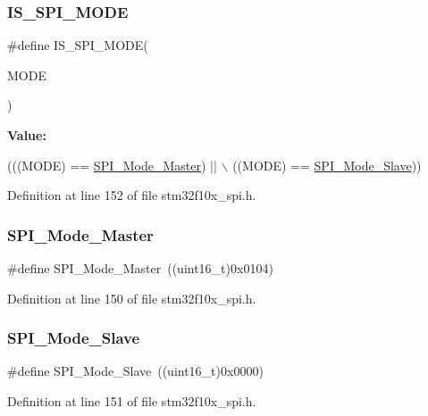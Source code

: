 \subsubsection{\texorpdfstring{I\+S\+\_\+\+S\+P\+I\+\_\+\+M\+O\+DE}{IS\_SPI\_MODE}}
{\footnotesize\ttfamily \#define I\+S\+\_\+\+S\+P\+I\+\_\+\+M\+O\+DE(\begin{DoxyParamCaption}\item[{}]{M\+O\+DE }\end{DoxyParamCaption})}

{\bfseries Value\+:}
\begin{DoxyCode}
(((MODE) == \hyperlink{group___s_p_i__mode_gaa9e47fb7c1d6c4655b72a00ed1f3b651}{SPI\_Mode\_Master}) || \(\backslash\)
                           ((MODE) == \hyperlink{group___s_p_i__mode_ga84621141413ee07cb2d2dc82da2baa42}{SPI\_Mode\_Slave}))
\end{DoxyCode}


Definition at line 152 of file stm32f10x\+\_\+spi.\+h.

\mbox{\label{group___s_p_i__mode_gaa9e47fb7c1d6c4655b72a00ed1f3b651}} 
\subsubsection{\texorpdfstring{S\+P\+I\+\_\+\+Mode\+\_\+\+Master}{SPI\_Mode\_Master}}
{\footnotesize\ttfamily \#define S\+P\+I\+\_\+\+Mode\+\_\+\+Master~((uint16\+\_\+t)0x0104)}



Definition at line 150 of file stm32f10x\+\_\+spi.\+h.

\mbox{\label{group___s_p_i__mode_ga84621141413ee07cb2d2dc82da2baa42}} 
\subsubsection{\texorpdfstring{S\+P\+I\+\_\+\+Mode\+\_\+\+Slave}{SPI\_Mode\_Slave}}
{\footnotesize\ttfamily \#define S\+P\+I\+\_\+\+Mode\+\_\+\+Slave~((uint16\+\_\+t)0x0000)}



Definition at line 151 of file stm32f10x\+\_\+spi.\+h.

